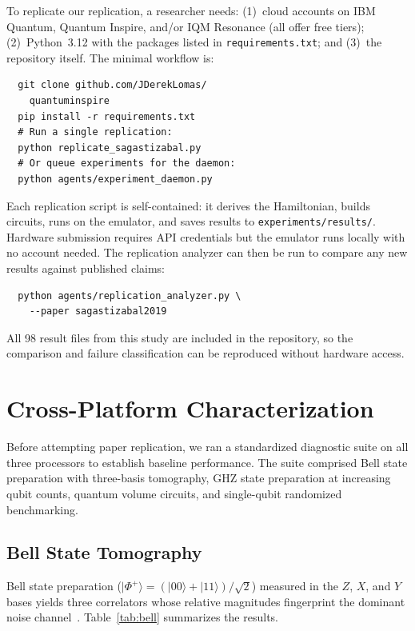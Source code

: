 \documentclass[twocolumn,prl,superscriptaddress,nofootinbib]{revtex4-2}
\begin{document}
To replicate our replication, a researcher needs: (1)~cloud accounts on IBM Quantum, Quantum Inspire, and/or IQM Resonance (all offer free tiers); (2)~Python~3.12 with the packages listed in \texttt{requirements.txt}; and (3)~the repository itself.
The minimal workflow is:
\begin{verbatim}
  git clone github.com/JDerekLomas/
    quantuminspire
  pip install -r requirements.txt
  # Run a single replication:
  python replicate_sagastizabal.py
  # Or queue experiments for the daemon:
  python agents/experiment_daemon.py
\end{verbatim}
Each replication script is self-contained: it derives the Hamiltonian, builds circuits, runs on the emulator, and saves results to \texttt{experiments/results/}.
Hardware submission requires API credentials but the emulator runs locally with no account needed.
The replication analyzer can then be run to compare any new results against published claims:
\begin{verbatim}
  python agents/replication_analyzer.py \
    --paper sagastizabal2019
\end{verbatim}
All 98 result files from this study are included in the repository, so the comparison and failure classification can be reproduced without hardware access.

\section{Cross-Platform Characterization}
\label{sec:platforms}

Before attempting paper replication, we ran a standardized diagnostic suite on all three processors to establish baseline performance.
The suite comprised Bell state preparation with three-basis tomography, GHZ state preparation at increasing qubit counts, quantum volume circuits, and single-qubit randomized benchmarking.

\subsection{Bell State Tomography}

Bell state preparation ($|\Phi^+\rangle = (|00\rangle + |11\rangle)/\sqrt{2}$) measured in the $Z$, $X$, and $Y$ bases yields three correlators whose relative magnitudes fingerprint the dominant noise channel~\cite{temme2017}.
Table~\ref{tab:bell} summarizes the results.
\end{document}
